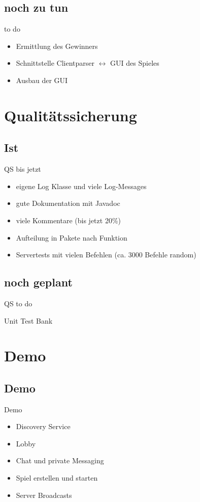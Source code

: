 \documentclass[12pt, utf8]{beamer}
\begin{document}
\subsection{noch zu tun} 
\begin{frame}{to do}
\begin{itemize}
\item Ermittlung des Gewinners
\item Schnittstelle Clientparser $\leftrightarrow$ GUI des Spieles
\item Ausbau der GUI
\end{itemize}
\end{frame}

\section{Qualitätssicherung}
\subsection{Ist}
\begin{frame}{QS bis jetzt}
\begin{itemize}
\item eigene Log Klasse und viele Log-Messages
\item gute Dokumentation mit Javadoc
\item viele Kommentare (bis jetzt 20\%)
\item Aufteilung in Pakete nach Funktion
\item Servertests mit vielen Befehlen (ca. 3000 Befehle random)
\end{itemize}
\end{frame}

\subsection{noch geplant}
\begin{frame}{QS to do}
	\begin{exampleblock}{Unit Test}
		Bank
	\end{exampleblock}
\end{frame}


\section{Demo}
\subsection{Demo}
\begin{frame}{Demo}
\begin{itemize}
\item Discovery Service
\item Lobby
\item Chat und private Messaging
\item Spiel erstellen und starten
\item Server Broadcasts
\end{itemize}
\end{frame}
\end{document}
